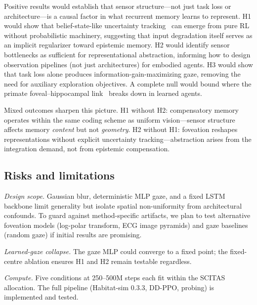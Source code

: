 \documentclass[10pt,conference,compsocconf]{IEEEtran}
\begin{document}
Positive results would establish that sensor structure---not just task loss or architecture---is a causal factor in what recurrent memory learns to represent. H1 would show that belief-state-like uncertainty tracking~\cite{hennig2023belief} can emerge from pure RL without probabilistic machinery, suggesting that input degradation itself serves as an implicit regularizer toward epistemic memory. H2 would identify sensor bottlenecks as sufficient for representational abstraction, informing how to design observation pipelines (not just architectures) for embodied agents. H3 would show that task loss alone produces information-gain-maximizing gaze, removing the need for auxiliary exploration objectives. A complete null would bound where the primate foveal--hippocampal link~\cite{wirth2017gaze} breaks down in learned agents.

Mixed outcomes sharpen this picture. H1 without H2: compensatory memory operates within the same coding scheme as uniform vision---sensor structure affects memory \emph{content} but not \emph{geometry}. H2 without H1: foveation reshapes representations without explicit uncertainty tracking---abstraction arises from the integration demand, not from epistemic compensation.

\subsection{Risks and limitations}

\emph{Design scope.} Gaussian blur, deterministic MLP gaze, and a fixed LSTM backbone limit generality but isolate spatial non-uniformity from architectural confounds. To guard against method-specific artifacts, we plan to test alternative foveation models (log-polar transform, ECG image pyramids) and gaze baselines (random gaze) if initial results are promising.

\emph{Learned-gaze collapse.} The gaze MLP could converge to a fixed point; the fixed-centre ablation ensures H1 and H2 remain testable regardless.

\emph{Compute.} Five conditions at 250--500M steps each fit within the SCITAS allocation. The full pipeline (Habitat-sim 0.3.3, DD-PPO, probing) is implemented and tested.



\end{document}
